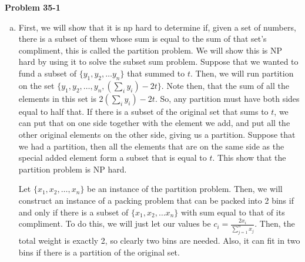 \documentclass{article}
\begin{document}
\noindent\textbf{Problem 35-1}\\
\begin{enumerate}[a.]
\item 
First, we will show that it is np hard to determine if, given a set of numbers, there is a subset of them whose sum is equal to the sum of that set's compliment, this is called the partition problem. We will show this is NP hard by using it to solve the subset sum problem. Suppose that we wanted to fund a subset of $\{y_1,y_2, \ldots y_n\}$ that summed to $t$. Then, we will run partition on the set $\{y_1,y_2,\ldots, y_n, \left(\sum_i y_i\right) - 2t\}$. Note then, that the sum of all the elements in this set is $2\left(\sum_i y_i \right) -2t$. So, any partition must have both sides equal to half that. If there is a subset of the original set that sums to $t$, we can put that on one side together with the element we add, and put all the other original elements on the other side, giving us a partition. Suppose that we had a partition, then all the elements that are on the same side as the special added element form a subset that is equal to $t$. This show that the partition problem is NP hard.

Let $\{x_1,x_2,\ldots,x_n\}$ be an instance of the partition problem. Then, we will construct an instance of a packing problem that can be packed into 2 bins if and only if there is a subset of $\{x_1,x_2,\ldots x_n\}$ with sum equal to that of its compliment. To do this, we will just let our values be $c_i = \frac{2x_i}{\sum_{j=1}^n x_j}$. Then, the total weight is exactly 2, so clearly two bins are needed. Also, it can fit in two bins if there is a partition of the original set.

\begin{comment}
  First, sort the items from largest to smallest. We will use a polynomial time solution to the bin packing problem to, in polynomial time, decide whether or not the largest item is in a solution to the subset sum problem. Then, based on that we get an instance of the subset sum problem which has one fewer items. Continuing in this, way, we either construct a subset that sums to the given value, or show that none of the items can be in a solution, meaning that no solution can exist.


\end{comment}
\end{enumerate}
\end{document}
